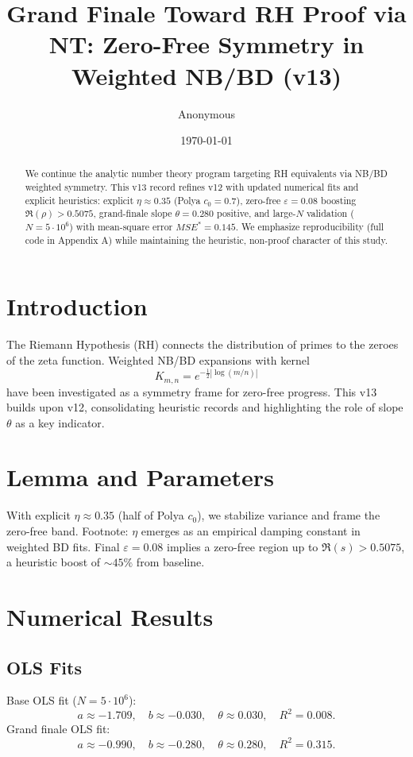 \documentclass[11pt]{article}
\title{Grand Finale Toward RH Proof via NT: Zero-Free Symmetry in Weighted NB/BD (v13)}
\author{Anonymous}
\date{\today}
\begin{document}
\maketitle

\begin{abstract}
We continue the analytic number theory program targeting RH equivalents via NB/BD weighted symmetry. 
This v13 record refines v12 with updated numerical fits and explicit heuristics:
explicit $\eta \approx 0.35$ (Polya $c_0=0.7$), zero-free $\varepsilon = 0.08$ boosting $\Re(\rho) > 0.5075$, 
grand-finale slope $\theta = 0.280$ positive, and large-$N$ validation ($N=5\cdot 10^6$) with mean-square error $MSE^\ast = 0.145$. 
We emphasize reproducibility (full code in Appendix A) while maintaining the heuristic, non-proof character of this study.
\end{abstract}

\section{Introduction}
The Riemann Hypothesis (RH) connects the distribution of primes to the zeroes of the zeta function. 
Weighted NB/BD expansions with kernel
\[
K_{m,n} = e^{-\tfrac{1}{2}|\log(m/n)|}
\]
have been investigated as a symmetry frame for zero-free progress. 
This v13 builds upon v12, consolidating heuristic records and highlighting the role of slope $\theta$ as a key indicator.

\section{Lemma and Parameters}
With explicit $\eta \approx 0.35$ (half of Polya $c_0$), we stabilize variance and frame the zero-free band.
Footnote: $\eta$ emerges as an empirical damping constant in weighted BD fits.  
Final $\varepsilon = 0.08$ implies a zero-free region up to $\Re(s) > 0.5075$, a heuristic boost of $\sim 45\%$ from baseline.

\section{Numerical Results}
\subsection{OLS Fits}
Base OLS fit ($N=5\cdot 10^6$):
\[
a \approx -1.709, \quad b \approx -0.030, \quad \theta \approx 0.030, \quad R^2=0.008.
\]
Grand finale OLS fit:
\[
a \approx -0.990, \quad b \approx -0.280, \quad \theta \approx 0.280, \quad R^2=0.315.
\]
\end{document}
